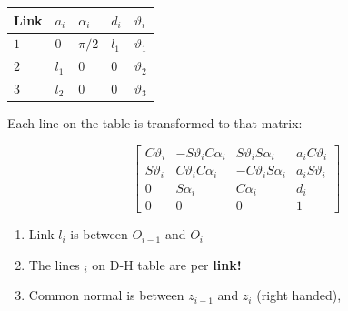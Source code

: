 \documentclass{article}
\begin{document}
\begin{table}[h!]
    \begin{tabular}{|l|l|l|l|l|}
        \hline
        Link & $a_i$   & $\alpha_i$ & $d_i$  & $\vartheta_i$ \\ \hline
        $1$  &  $0$    &    $\pi/2$ &  $l_1$ & $\vartheta_1$ \\ \hline
        $2$  &  $l_1$  &    $0$     &  $0$   & $\vartheta_2$ \\ \hline
        $3$  &  $l_2$  &    $0$     &  $0$   & $\vartheta_3$ \\ \hline
\end{tabular}
\end{table}

Each line on the table is transformed to that matrix:

    \begin{equation*}
        \begin{bmatrix}
        C\vartheta_i &  -S\vartheta_i C\alpha_i &  S\vartheta_i S\alpha_i &  a_i C\vartheta_i\\
        S\vartheta_i & C\vartheta_i C\alpha_i   & -C\vartheta_i S\alpha_i & a_i S\vartheta_i \\
        0            & S\alpha_i                & C\alpha_i               & d_i              \\
        0            & 0                        & 0                       & 1
        \end{bmatrix}
    \end{equation*}


\begin{enumerate}
    \item Link $l_i$ is between $O_{i-1}$ and  $O_{i}$
    \item The lines $_i$ on D-H table are per \textbf{link!}
    \item Common normal is between $z_{i-1}$ and $z_{i}$ (right handed),

\end{enumerate}
\end{document}
